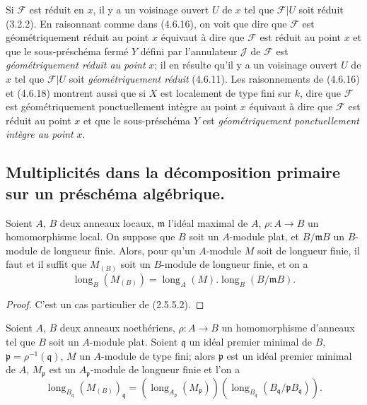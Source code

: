 
Si $\mathscr F$ est réduit en $x$, il y a un voisinage ouvert $U$ de $x$ tel
que $\mathscr F|U$ soit réduit (3.2.2). En raisonnant comme dans (4.6.16), on
voit que dire que $\mathscr F$ est géométriquement réduit au point $x$
équivaut à dire que $\mathscr F$ est réduit au point $x$ et que le
sous-préschéma fermé $Y$ défini par l'annulateur $\mathscr J$ de $\mathscr F$
est \emph{géométriquement réduit au point} $x$; il en résulte qu'il y a un voisinage
ouvert $U$ de $x$ tel que $\mathscr F|U$ soit \emph{géométriquement réduit} (4.6.11).
Les raisonnements de (4.6.16) et (4.6.18) montrent aussi que si $X$ est
localement de type fini sur $k$, dire que $\mathscr F$ est géométriquement
ponctuellement intègre au point $x$ équivaut à dire que $\mathscr F$ est
réduit au point $x$ et que le sous-préschéma $Y$ est \emph{géométriquement
ponctuellement intègre au point} $x$.

\subsection{Multiplicités dans la décomposition primaire sur un préschéma
algébrique.}
\label{subsection:IV.4.7-fr}

\begin{lemma}[4.7.1]
\label{IV.2.4.7.1-fr}
Soient $A$, $B$ deux anneaux locaux, $\mathfrak m$ l'idéal maximal de $A$,
$\rho:A\to B$ un homomorphisme local. On suppose que $B$ soit un $A$-module
plat, et $B/\mathfrak mB$ un $B$-module de longueur finie. Alors, pour qu'un
$A$-module $M$ soit de longueur finie, il faut et il suffit que $M_{(B)}$ soit
un $B$-module de longueur finie, et on a
\begin{equation}
\operatorname{long}_B(M_{(B)})
=\operatorname{long}_A(M).\operatorname{long}_B(B/\mathfrak mB).
\tag{4.7.1.1}
\label{IV.2.4.7.1.1-fr}
\end{equation}
\end{lemma}

\begin{proof}
C'est un cas particulier de (2.5.5.2).
\end{proof}


\begin{corollary}[4.7.2]
\label{IV.2.4.7.2-fr}
Soient $A$, $B$ deux anneaux noethériens, $\rho:A\to B$ un homomorphisme
d'anneaux tel que $B$ soit un $A$-module plat. Soient $\mathfrak q$ un idéal
premier minimal de $B$, $\mathfrak p=\rho^{-1}(\mathfrak q)$, $M$ un
$A$-module de type fini; alors $\mathfrak p$ est un idéal premier minimal de
$A$, $M_{\mathfrak p}$ est un $A_{\mathfrak p}$-module de longueur finie et
l'on a
\begin{equation}
\operatorname{long}_{B_{\mathfrak q}}(M_{(B)})_{\mathfrak q}
=(\operatorname{long}_{A_{\mathfrak p}}(M_{\mathfrak p}))
 (\operatorname{long}_{B_{\mathfrak q}}
 (B_{\mathfrak q}/\mathfrak pB_{\mathfrak q})).
\tag{4.7.2.1}
\label{IV.2.4.7.2.1-fr}
\end{equation}
\end{corollary}

